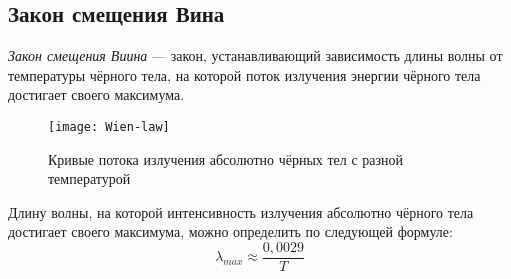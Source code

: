\subsection{Закон смещения Вина}
\textit{Закон смещения Виина} --- закон, устанавливающий зависимость длины волны от температуры чёрного тела, на которой поток излучения энергии чёрного тела достигает своего максимума.

\begin{figure}[h!]
\begin{center}
\texttt{[image: Wien-law]}
\end{center}
\caption{Кривые потока излучения абсолютно чёрных тел с разной температурой}
\end{figure}

Длину волны, на которой интенсивность излучения абсолютно чёрного тела достигает своего максимума, можно определить по следующей формуле:
\begin{equation}
\lambda_{max}\approx\frac{0,0029}{T}
\end{equation}
